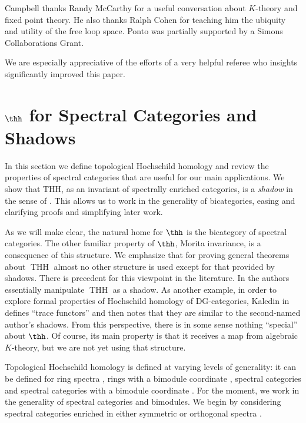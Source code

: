 \documentclass[11pt]{amsart}
\begin{document}
Campbell thanks Randy McCarthy for a useful conversation about $K$-theory and fixed point theory. He also thanks Ralph Cohen for teaching him the ubiquity and utility of the free loop space. 
Ponto was partially supported by a Simons Collaborations Grant.

We are especially appreciative of the efforts of a very helpful referee who insights significantly improved this paper. 

\section{$\thh$ for Spectral Categories and Shadows}\label{sect:thh_spectral}

In this section we define topological Hochschild homology and review the properties of spectral categories that are useful for our main applications. We show that THH, as an invariant of spectrally enriched categories, is a 
\textit{shadow} in the sense of \cite{p:thesis}. 
This allows us to work in the generality of bicategories, easing and clarifying proofs and simplifying later work.  

As we will make clear, the natural home for $\thh$ is the bicategory of spectral categories. The other familiar property of $\thh$, Morita invariance, is a consequence of this structure. We emphasize that for proving general theorems about $\operatorname{THH}$ almost no other structure is used except for that provided by shadows. There is precedent for this viewpoint in the literature. In \cite{blumberg_mandell} the authors essentially manipulate $\operatorname{THH}$ as a shadow. As another example, in order to explore formal properties of Hochschild homology of DG-categories, Kaledin in \cite{kaledin} defines ``trace functors'' and then notes that they are similar to the second-named author's shadows. From this perspective, there is in some sense nothing ``special'' about $\thh$. Of course, its main property is that it receives a map from algebraic $K$-theory, but we are not yet using that structure.

Topological Hochschild homology is defined at varying levels of generality: it can be defined for ring spectra \cite{bokstedt}, rings with a bimodule coordinate \cite{dundas_mccarthy}, spectral categories and spectral categories with a bimodule coordinate \cite{blumberg_mandell}. For the moment, we work in the generality of spectral categories and bimodules. We begin by considering spectral categories enriched in either symmetric or orthogonal spectra \cite{mandell_may_shipley_schwede}.
\end{document}
